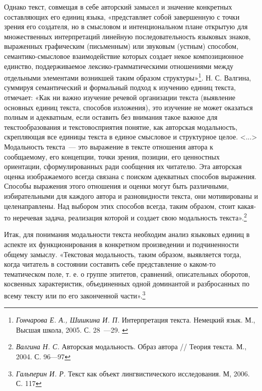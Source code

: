 \documentclass{kursa4}
\begin{document}
      Однако текст, совмещая в себе авторский замысел и значение конкретных составляющих его единиц языка, «представляет собой завершенную с точки зрения его создателя, но в смысловом и интенциональном плане открытую для множественных интерпретаций линейную последовательность языковых знаков, выраженных графическим (письменным) или звуковым (устным) способом, семантико-смысловое взаимодействие которых создает некое композиционное единство, поддерживаемое лексико-грамматическими отношениями между отдельными элементами возникшей таким образом структуры»\footnote{\textit{{Гончарова Е. А., Шишкина И. П. }}{Интерпретация текста. Немецкий язык. М., Высшая школа, 2005. С. 28~---29. }}. Н. С. Валгина, суммируя семантический и формальный подход к изучению единиц текста, отмечает: «Как ни важно изучение речевой организации текста (выявление основных единиц текста, способов изложения), это изучение не может оказаться полным и адекватным, если оставить без внимания такое важное для текстообразования и текстовосприятия понятие, как авторская модальность, скрепляющая все единицы текста в единое смысловое и структурное целое. \textless{}...\textgreater{} Модальность текста~--- это выражение в тексте отношения автора к сообщаемому, его концепции, точки зрения, позиции, его ценностных ориентации, сформулированных ради сообщения их читателю. Эта авторская оценка изображаемого всегда связана с поиском адекватных способов выражения. Способы выражения этого отношения и оценки могут быть различными, избирательными для каждого автора и разновидности текста, они мотивированы и целенаправлены. Над выбором этих способов всегда, таким образом, стоит какая-то неречевая задача, реализация которой и создает свою модальность текста».\footnote{\textit{{Валгина Н. С. }}{Авторская модальность. Образ автора // Теория текста. М., 2004. С. 96—97}} 

      Итак, для понимания модальности текста необходим анализ языковых единиц в аспекте их функционирования в конкретном произведении и подчиненности общему замыслу. «{Текстовая модальность, таким образом, выявляется тогда, когда читатель в состоянии составить себе представление о каком-то тематическом поле, т. е. о группе эпитетов, сравнений, описательных оборотов, косвенных характеристик, объединенных одной доминантой и разбросанных по всему тексту или по его законченной части».}\footnote{\textit{{Гальперин И. Р. }}{Текст как объект лингвистического исследования. М, 2006. С. 117}}{ }
\end{document}
